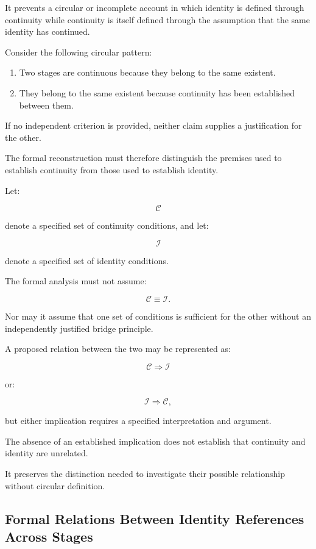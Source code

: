 It prevents a circular
or incomplete account
in which identity is defined
through continuity while
continuity is itself defined
through the assumption
that the same identity
has continued.

Consider the following
circular pattern:

\begin{enumerate}
    \item Two stages are
    continuous because
    they belong to the
    same existent.
    \item They belong to
    the same existent
    because continuity
    has been established
    between them.
\end{enumerate}

If no independent criterion
is provided, neither
claim supplies a justification
for the other.

The formal reconstruction
must therefore distinguish
the premises used to establish
continuity from those used
to establish identity.

Let:

\[
    \mathcal{C}
\]

denote a specified set
of continuity conditions,
and let:

\[
    \mathcal{I}
\]

denote a specified set
of identity conditions.

The formal analysis must
not assume:

\[
    \mathcal{C}
    \equiv
    \mathcal{I}.
\]

Nor may it assume that
one set of conditions
is sufficient for the
other without an independently
justified bridge principle.

A proposed relation between
the two may be represented
as:

\[
    \mathcal{C}
    \Rightarrow
    \mathcal{I}
\]

or:

\[
    \mathcal{I}
    \Rightarrow
    \mathcal{C},
\]

but either implication
requires a specified
interpretation and argument.

The absence of an established
implication does not
establish that continuity
and identity are unrelated.

It preserves the distinction
needed to investigate
their possible relationship
without circular definition.

\subsection{Formal Relations Between Identity References Across Stages}

